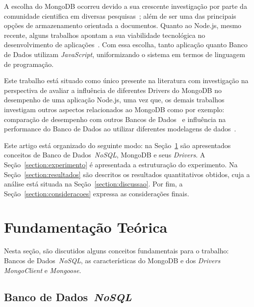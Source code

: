 \documentclass{svproc}
\begin{document}
A escolha do MongoDB ocorreu devido a sua crescente investigação por parte da comunidade cientifica em diversas pesquisas~\cite{patil:2017,jung:2015,ongo:2018,kanade2014study}; além de ser uma das principais opções de armazenamento orientada a documentos. Quanto ao Node.js, mesmo recente, alguns trabalhos apontam a sua viabilidade tecnológica no desenvolvimento de aplicações~\cite{chaniotis2015node}. Com essa escolha, tanto aplicação quanto Banco de Dados utilizam \textit{JavaScript}, uniformizando o sistema em termos de linguagem de programação.

Este trabalho está situado como único presente na literatura com investigação na perspectiva de avaliar a influência de diferentes Drivers do MongoDB no desempenho de uma aplicação Node.js, uma vez que, os demais trabalhos investigam outros aspectos relacionados ao MongoDB como por exemplo: comparação de desempenho com outros Bancos de Dados~\cite{jung:2015,patil:2017,ongo:2018} e influência na performance do Banco de Dados ao utilizar diferentes modelagens de dados~\cite{kanade2014study}.

Este artigo está organizado do seguinte modo: na Seção~\ref{section:fundamentacao} são apresentados conceitos de Banco de Dados~\emph{NoSQL}, MongoDB e seus \emph{Drivers}.
A Seção~\ref{section:experimento} é apresentada a estruturação do experimento. 
Na Seção~\ref{section:resultados} são descritos os resultados quantitativos obtidos, cuja a análise está situada na Seção~\ref{section:discussao}. Por fim, a Seção~\ref{section:consideracoes} expressa as considerações finais.

\section{Fundamentação Teórica}
\label{section:fundamentacao}

Nesta seção, são discutidos alguns conceitos fundamentais para o trabalho: Bancos de Dados~\emph{NoSQL}, as características do MongoDB e dos \emph{Drivers} \emph{MongoClient} e \emph{Mongoose}. 

\subsection{Banco de Dados~\emph{NoSQL}}
\label{subsection:nao-relacional}
\end{document}

